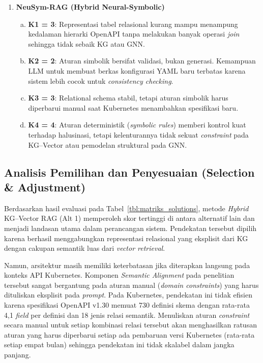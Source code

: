 \begin{enumerate}
    \item \textbf{NeuSym-RAG (Hybrid Neural-Symbolic)}
    \begin{enumerate}[a.]
        \item \textbf{K1 = 3}:
        Representasi tabel relasional kurang mampu menampung kedalaman hierarki OpenAPI tanpa melakukan banyak operasi \textit{join} sehingga tidak sebaik KG atau GNN.

        \item \textbf{K2 = 2}:
        Aturan simbolik bersifat validasi, bukan generasi. Kemampuan LLM untuk membuat berkas konfigurasi YAML baru terbatas karena sistem lebih cocok untuk \textit{consistency checking}.

        \item \textbf{K3 = 3}:
        Relational schema stabil, tetapi aturan simbolik harus diperbarui manual saat Kubernetes menambahkan spesifikasi baru.

        \item \textbf{K4 = 4}:
        Aturan deterministik (\textit{symbolic rules}) memberi kontrol kuat terhadap halusinasi, tetapi kelenturannya tidak sekuat \textit{constraint} pada KG--Vector atau pemodelan struktural pada GNN.
    \end{enumerate}

\end{enumerate}

\subsection{Analisis Pemilihan dan Penyesuaian (Selection \& Adjustment)}
Berdasarkan hasil evaluasi pada Tabel~\ref{tbl:matriks_solutions}, metode \textit{Hybrid} KG--Vector RAG (Alt 1) memperoleh skor tertinggi di antara alternatif lain dan menjadi landasan utama dalam perancangan sistem. Pendekatan tersebut dipilih karena berhasil menggabungkan representasi relasional yang eksplisit dari KG dengan cakupan semantik luas dari \textit{vector retrieval}.

Namun, arsitektur \textcite{wan2025empowering} masih memiliki keterbatasan jika diterapkan langsung pada konteks API Kubernetes. Komponen \textit{Semantic Alignment} pada penelitian tersebut sangat bergantung pada aturan manual (\textit{domain constraints}) yang harus dituliskan eksplisit pada \textit{prompt}. Pada Kubernetes, pendekatan ini tidak efisien karena spesifikasi OpenAPI v1.30 memuat 730 definisi skema dengan rata-rata 4,1 \textit{field} per definisi dan 18 jenis relasi semantik. Menuliskan aturan \textit{constraint} secara manual untuk setiap kombinasi relasi tersebut akan menghasilkan ratusan aturan yang harus diperbarui setiap ada pembaruan versi Kubernetes (rata-rata setiap empat bulan) sehingga pendekatan ini tidak skalabel dalam jangka panjang.

